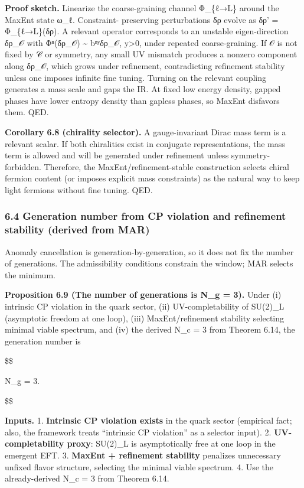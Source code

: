 \documentclass[11pt,a4paper]{article}
\theoremstyle{remark}
\begin{document}
\textbf{Proof sketch.} Linearize the coarse-graining channel
Φ\_\{ℓ→L\} around the MaxEnt state ω\_ℓ. Constraint-
preserving perturbations δρ evolve as
δρ' = Φ\_\{ℓ→L\}(δρ). A relevant operator corresponds
to an unstable eigen-direction δρ\_𝒪 with
\textbar Φⁿ(δρ\_𝒪)\textbar{} \textasciitilde{} bⁿʸ\textbar δρ\_𝒪\textbar,
y\textgreater0, under repeated coarse-graining. If 𝒪 is not fixed by
𝒞 or symmetry, any small UV mismatch produces a nonzero
component along δρ\_𝒪, which grows under refinement,
contradicting refinement stability unless one imposes infinite fine tuning.
Turning on the relevant coupling generates a mass scale and gaps the IR.
At fixed low energy density, gapped phases have lower entropy density than
gapless phases, so MaxEnt disfavors them. QED.

\textbf{Corollary 6.8 (chirality selector).} A gauge-invariant Dirac mass term is
a relevant scalar. If both chiralities exist in conjugate representations,
the mass term is allowed and will be generated under refinement unless
symmetry-forbidden. Therefore, the MaxEnt/refinement-stable construction
selects chiral fermion content (or imposes explicit mass constraints) as the
natural way to keep light fermions without fine tuning. QED.

\subsubsection{6.4 Generation number from CP violation and refinement stability (derived from MAR)}\label{generation-number-from-cp-violation-and-refinement-stability-derived-from-mar}

Anomaly cancellation is generation-by-generation, so it does not fix the
number of generations. The admissibility conditions constrain the window;
MAR selects the minimum.

\textbf{Proposition 6.9 (The number of generations is N\_g = 3).} Under (i)
intrinsic CP violation in the quark sector, (ii) UV-completability of
SU(2)\_L (asymptotic freedom at one loop), (iii) MaxEnt/refinement
stability selecting minimal viable spectrum, and (iv) the derived N\_c = 3
from Theorem 6.14, the generation number is

\$\$

N\_g = 3.

\$\$

\textbf{Inputs.}
1. \textbf{Intrinsic CP violation exists} in the quark sector (empirical fact;
also, the framework treats ``intrinsic CP violation'' as a selector input).
2. \textbf{UV-completability proxy}: SU(2)\_L is asymptotically free at one
loop in the emergent EFT.
3. \textbf{MaxEnt + refinement stability} penalizes unnecessary unfixed flavor
structure, selecting the minimal viable spectrum.
4. Use the already-derived N\_c = 3 from Theorem 6.14.
\end{document}
